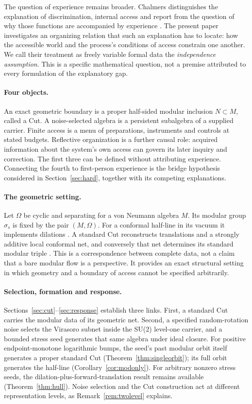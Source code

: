 \documentclass[12pt]{article}
\theoremstyle{definition}
\theoremstyle{remark}
\begin{document}
The question of experience remains broader. Chalmers distinguishes the
explanation of discrimination, internal access and report from the question
of why those functions are accompanied by experience \cite{Chalmers}.
The present paper investigates an organizing relation that such an
explanation has to locate: how the accessible world and the process's
conditions of access constrain one another. We call their treatment as
freely variable formal data the \emph{independence assumption}. This is a
specific mathematical question, not a premise attributed to every
formulation of the explanatory gap.

\paragraph{Four objects.}
An exact geometric boundary is a proper half-sided modular inclusion
\(N\subset M\), called a Cut. A noise-selected algebra is a persistent
subalgebra of a supplied carrier. Finite access is a menu of preparations,
instruments and controls at stated budgets. Reflective organization is a
further causal role: acquired information about the system's own access
can govern its later inquiry and correction. The first three can be
defined without attributing experience. Connecting the fourth to
first-person experience is the bridge hypothesis considered in
Section~\ref{sec:hard}, together with its competing explanations.

\paragraph{The geometric setting.}
Let \(\Omega\) be cyclic and separating for a von Neumann algebra \(M\).
Its modular group \(\sigma_s\) is fixed by the pair \((M,\Omega)\).
For a conformal half-line in its vacuum it implements dilations
\cite{BW,BGL}. A standard Cut reconstructs translations and a strongly
additive local conformal net, and conversely that net determines its
standard modular triple \cite{GLW}. This is a correspondence between
complete data, not a claim that a bare modular flow is a perspective.
It provides an exact structural setting in which geometry and a boundary
of access cannot be specified arbitrarily.

\paragraph{Selection, formation and response.}
Sections~\ref{sec:cut}--\ref{sec:response} establish three links.
First, a standard Cut carries the modular data of its geometric net.
Second, a specified random-rotation noise selects the Virasoro subnet
inside the SU(2) level-one carrier, and a bounded stress seed generates
that same algebra under ideal closure. For positive endpoint-monotone
logarithmic bumps, the seed's past modular orbit itself generates a
proper standard Cut (Theorem~\ref{thm:singleorbit}); its full orbit
generates the half-line (Corollary~\ref{cor:modonly}). For arbitrary
nonzero stress seeds, the dilation-plus-forward-translation result
remains available (Theorem~\ref{thm:hull}). Noise selection and the Cut
construction act at different representation levels, as
Remark~\ref{rem:twolevel} explains.
\end{document}
